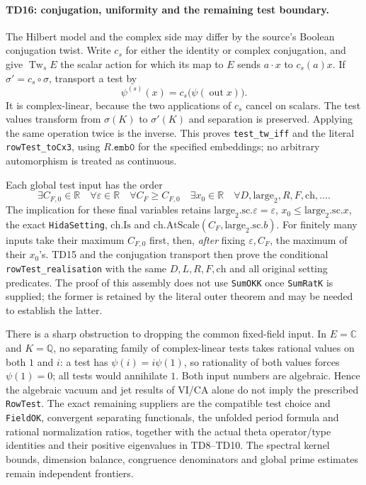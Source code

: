 \paragraph{TD16: conjugation, uniformity and the remaining test boundary.}
The Hilbert model and the complex side may differ by the source's
Boolean conjugation twist. Write $c_s$ for either the identity or
complex conjugation, and give $\operatorname{Tw}_s E$ the scalar action
for which its map to $E$ sends $a\cdot x$ to $c_s(a)x$.
If $\sigma'=c_s\circ\sigma$, transport a test by
\[
 \psi^{(s)}(x)=c_s\bigl(\psi(\operatorname{out}x)\bigr).
\]
It is complex-linear, because the two applications of $c_s$ cancel
on scalars. The test values transform from $\sigma(K)$ to
$\sigma'(K)$ and separation is preserved. Applying the same operation
twice is the inverse. This proves \texttt{test\_tw\_iff} and the
literal \texttt{rowTest\_toCx3}, using $R.\texttt{emb0}$ for the
specified embeddings; no arbitrary automorphism is treated as
continuous.

Each global test input has the order
\[
 \exists C_{F,0}\in\mathbb R\quad
 \forall\varepsilon\in\mathbb R\quad \forall C_F\ge C_{F,0}\quad
 \exists x_0\in\mathbb R\quad
 \forall D,\mathrm{large}_2,R,F,\mathrm{ch},\ldots .
\]
The implication for these final variables retains
$\mathrm{large}_2.\mathrm{sc}.\varepsilon=\varepsilon$,
$x_0\le\mathrm{large}_2.\mathrm{sc}.x$, the exact
\texttt{HidaSetting}, $\mathrm{ch}.\mathrm{Is}$ and
$\mathrm{ch}.\mathrm{AtScale}(C_F,\mathrm{large}_2.\mathrm{sc}.b)$.
For finitely many inputs take their maximum $C_{F,0}$ first, then,
\emph{after} fixing $\varepsilon,C_F$, the maximum of their $x_0$'s.
TD15 and the conjugation transport then prove the conditional
\texttt{rowTest\_realisation} with the same $D,L,R,F,\mathrm{ch}$ and
all original setting predicates. The proof of this assembly does not
use \texttt{SumOKK} once \texttt{SumRatK} is supplied; the former is
retained by the literal outer theorem and may be needed to establish
the latter.

There is a sharp obstruction to dropping the common fixed-field input.
In $E=\mathbb C$ and $K=\mathbb Q$, no separating family of
complex-linear tests takes rational values on both $1$ and $i$:
a test has $\psi(i)=i\psi(1)$, so rationality of both values forces
$\psi(1)=0$; all tests would annihilate $1$. Both input numbers are
algebraic. Hence the algebraic vacuum and jet results of VI/CA alone
do not imply the prescribed \texttt{RowTest}. The exact remaining
suppliers are the compatible test choice and \texttt{FieldOK},
convergent separating functionals, the unfolded period formula and
rational normalization ratios, together with the actual theta
operator/type identities and their positive eigenvalues in TD8--TD10.
The spectral kernel bounds, dimension balance, congruence denominators
and global prime estimates remain independent frontiers.
